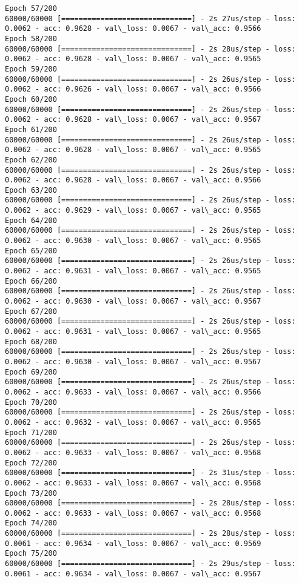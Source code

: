 \documentclass[11pt]{article}
\begin{document}
\begin{Verbatim}[commandchars=\\\{\}]
Epoch 57/200
60000/60000 [==============================] - 2s 27us/step - loss: 0.0062 - acc: 0.9628 - val\_loss: 0.0067 - val\_acc: 0.9566
Epoch 58/200
60000/60000 [==============================] - 2s 28us/step - loss: 0.0062 - acc: 0.9628 - val\_loss: 0.0067 - val\_acc: 0.9565
Epoch 59/200
60000/60000 [==============================] - 2s 26us/step - loss: 0.0062 - acc: 0.9626 - val\_loss: 0.0067 - val\_acc: 0.9566
Epoch 60/200
60000/60000 [==============================] - 2s 26us/step - loss: 0.0062 - acc: 0.9628 - val\_loss: 0.0067 - val\_acc: 0.9567
Epoch 61/200
60000/60000 [==============================] - 2s 26us/step - loss: 0.0062 - acc: 0.9628 - val\_loss: 0.0067 - val\_acc: 0.9565
Epoch 62/200
60000/60000 [==============================] - 2s 26us/step - loss: 0.0062 - acc: 0.9628 - val\_loss: 0.0067 - val\_acc: 0.9566
Epoch 63/200
60000/60000 [==============================] - 2s 26us/step - loss: 0.0062 - acc: 0.9629 - val\_loss: 0.0067 - val\_acc: 0.9565
Epoch 64/200
60000/60000 [==============================] - 2s 26us/step - loss: 0.0062 - acc: 0.9630 - val\_loss: 0.0067 - val\_acc: 0.9565
Epoch 65/200
60000/60000 [==============================] - 2s 26us/step - loss: 0.0062 - acc: 0.9631 - val\_loss: 0.0067 - val\_acc: 0.9565
Epoch 66/200
60000/60000 [==============================] - 2s 26us/step - loss: 0.0062 - acc: 0.9630 - val\_loss: 0.0067 - val\_acc: 0.9567
Epoch 67/200
60000/60000 [==============================] - 2s 26us/step - loss: 0.0062 - acc: 0.9631 - val\_loss: 0.0067 - val\_acc: 0.9565
Epoch 68/200
60000/60000 [==============================] - 2s 26us/step - loss: 0.0062 - acc: 0.9630 - val\_loss: 0.0067 - val\_acc: 0.9567
Epoch 69/200
60000/60000 [==============================] - 2s 26us/step - loss: 0.0062 - acc: 0.9633 - val\_loss: 0.0067 - val\_acc: 0.9566
Epoch 70/200
60000/60000 [==============================] - 2s 26us/step - loss: 0.0062 - acc: 0.9632 - val\_loss: 0.0067 - val\_acc: 0.9565
Epoch 71/200
60000/60000 [==============================] - 2s 26us/step - loss: 0.0062 - acc: 0.9633 - val\_loss: 0.0067 - val\_acc: 0.9568
Epoch 72/200
60000/60000 [==============================] - 2s 31us/step - loss: 0.0062 - acc: 0.9633 - val\_loss: 0.0067 - val\_acc: 0.9568
Epoch 73/200
60000/60000 [==============================] - 2s 28us/step - loss: 0.0062 - acc: 0.9633 - val\_loss: 0.0067 - val\_acc: 0.9568
Epoch 74/200
60000/60000 [==============================] - 2s 28us/step - loss: 0.0061 - acc: 0.9634 - val\_loss: 0.0067 - val\_acc: 0.9569
Epoch 75/200
60000/60000 [==============================] - 2s 29us/step - loss: 0.0061 - acc: 0.9634 - val\_loss: 0.0067 - val\_acc: 0.9567

\end{Verbatim}
\end{document}
